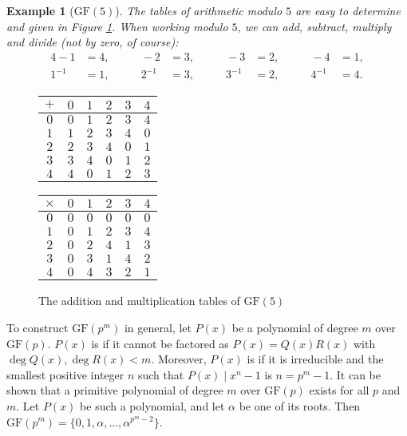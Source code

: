 \documentclass[a4paper, 11pt]{book}
\numberwithin{equation}{section}
\theoremstyle{plain}
\newtheorem{example}	[equation]	{Example}
\newcommand{\GF}{\mathrm{GF}}
\renewcommand{\(}{\ldbrack}
\renewcommand{\)}{\rdbrack}
\newcommand{\BF}[1]{{\bf\boldmath{#1}\unboldmath}}
\begin{document}
\begin{example}[$\GF(5)$]
The tables of arithmetic modulo $5$ are easy to determine and given in Figure \ref{fig:GF5}. When working modulo $5$, we can add, subtract, multiply and divide (not by zero, of course): 
\begin{alignat*}{4}
	-1 &= 4, 		&\qquad -2 &= 3,		&\qquad -3 &= 2, 	&\qquad -4 &= 1,\\
	1^{-1} &= 1, 	&\qquad 2^{-1} &= 3, &\qquad 3^{-1} &= 2, &\qquad 4^{-1} &= 4.
\end{alignat*}
\end{example}


\begin{figure}
\centering
\begin{tabular}{c|ccccc}
	$+$ & $0$ & $1$ & $2$ & $3$ & $4$\\
	\hline
	$0$ & $0$ & $1$ & $2$ & $3$ & $4$\\
	$1$ & $1$ & $2$ & $3$ & $4$ & $0$\\
	$2$ & $2$ & $3$ & $4$ & $0$ & $1$\\
	$3$ & $3$ & $4$ & $0$ & $1$ & $2$\\
	$4$ & $4$ & $0$ & $1$ & $2$ & $3$
\end{tabular} \hspace{2cm}
\begin{tabular}{c|ccccc}
	$\times$ & $0$ & $1$ & $2$ & $3$ & $4$\\
	\hline
	$0$ & $0$ & $0$ & $0$ & $0$ & $0$\\
	$1$ & $0$ & $1$ & $2$ & $3$ & $4$\\
	$2$ & $0$ & $2$ & $4$ & $1$ & $3$\\
	$3$ & $0$ & $3$ & $1$ & $4$ & $2$\\
	$4$ & $0$ & $4$ & $3$ & $2$ & $1$
\end{tabular}
\caption{The addition and multiplication tables of $\GF(5)$} \label{fig:GF5}
\end{figure}



To construct $\GF(p^m)$ in general, let $P(x)$ be a polynomial of degree $m$ over $\GF(p)$. $P(x)$ is \BF{irreducible} if it cannot be factored as $P(x) = Q(x)R(x)$ with $\deg Q(x), \deg R(x) < m$. Moreover, $P(x)$ is \BF{primitive} if it is irreducible and the smallest positive integer $n$ such that $P(x) \mid x^n - 1$ is $n = p^m-1$. It can be shown that a primitive polynomial of degree $m$ over $\GF(p)$ exists for all $p$ and $m$. Let $P(x)$ be such a polynomial, and let $\alpha$ be one of its roots. Then $\GF(p^m) = \{0,1,\alpha,\dots, \alpha^{p^m-2}\}$.
\end{document}
